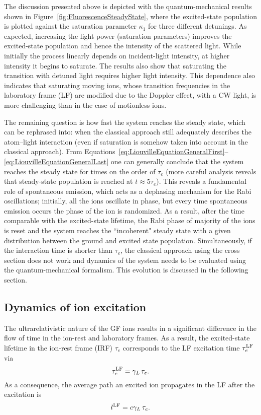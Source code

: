The discussion presented above is depicted with the quantum-mechanical results shown in Figure~\ref{fig:FluorescenceSteadyState}, where the excited-state population is plotted against the saturation parameter $\kappa_1$ for three different detunings.  As expected, increasing the light power (saturation parameters) improves the excited-state population and hence the intensity of the scattered light.  While initially the process linearly depends on incident-light intensity, at higher intensity it begins to saturate.  The results also show that saturating the transition with detuned light requires higher light intensity.  This dependence also indicates that saturating moving ions, whose transition frequencies in the laboratory frame (LF) are modified due to the Doppler effect, with a CW light, is more challenging than in the case of motionless ions.

The remaining question is how fast the system reaches the steady state, which can be rephrased into: when the classical approach still adequately describes the atom--light interaction (even if saturation is somehow taken into account in the classical approach).  From Equations~\ref{eq:LiouvilleEquationGeneralFirst}--\ref{eq:LiouvilleEquationGeneralLast} one can generally conclude that the system reaches the steady state for times on the order of $\tau_e$  (more careful analysis reveals that steady-state population is reached at $t\approx 5\tau_e$).  This reveals a fundamental role of spontaneous emission, which acts as a dephasing mechanism for the Rabi oscillations;  initially, all the ions oscillate in phase, but every time spontaneous emission occurs the phase of the ion is randomized. As a result, after the time comparable with the excited-state lifetime, the Rabi phase of majority of the ions is reset and the system reaches the ``incoherent" steady state with a given distribution between the ground and excited state population. Simultaneously, if the interaction time is shorter than $\tau_e$, the classical approach using the cross section does not work and dynamics of the system needs to be evaluated using the quantum-mechanical formalism.  This evolution is discussed in the following section.

\subsection{Dynamics of ion excitation\label{Sec:DynamicsPumping}}

The ultrarelativistic nature of the GF ions results in a significant difference in the flow of time in the ion-rest and laboratory frames.  As a result, the excited-state lifetime in the ion-rest frame (IRF) $\tau_e$ corresponds to the LF excitation time $\tau_e^{\rm LF}$ via
\begin{equation}
    \tau_e^{\rm LF}=\gamma_L\,\tau_e.
\end{equation}
As a consequence, the average path an excited ion propagates in the LF after the excitation is
\begin{equation}
    l^{\rm LF}=c\gamma_L\,\tau_e.
\end{equation}

